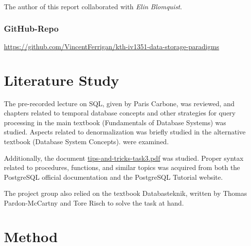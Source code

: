 \documentclass[a4paper]{scrartcl}
\begin{document}
The author of this report collaborated with
\emph{Elin Blomquist}.

\subsubsection*{GitHub-Repo}
\url{https://github.com/VincentFerrigan/kth-iv1351-data-storage-paradigms}

\section{Literature Study}
The pre-recorded lecture on SQL, given by 
Paris Carbone, 
was reviewed, 
and chapters related to temporal database concepts and other
strategies for query processing in the main textbook
(Fundamentals of Database Systems) was studied. 
Aspects related to denormalization was briefly studied in the alternative
textbook (Database System Concepts).
were examined. 

Additionally, the document 
\href{https://canvas.kth.se/courses/43013/files/7104569?wrap=1}{tips-and-tricks-task3.pdf}
was studied.
Proper syntax related to procedures, functions, and similar topics was acquired
from both the PostgreSQL official documentation and the PostgreSQL Tutorial
website.

The project group also relied on the textbook Databasteknik, written by
Thomas Pardon-McCartny and Tore Risch to solve the task at hand.

\clearpage
\section{Method}
\label{sec:method}
\end{document}
